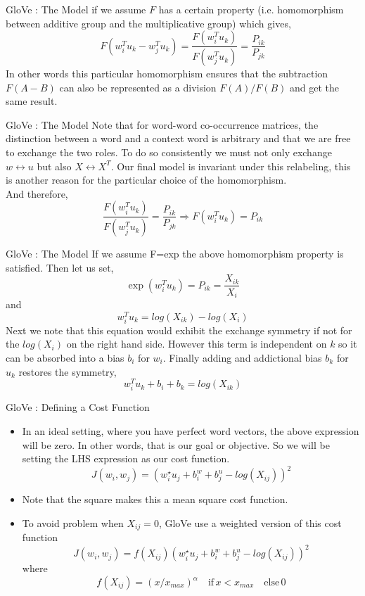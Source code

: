 \documentclass[11pt]{beamer}
\begin{document}
\begin{frame}{GloVe : The Model}
if we assume $F$ has a certain property (i.e. homomorphism between additive group and the multiplicative group) which gives,
$$F(w_i^T u_k-w_j^T u_k) = \frac{F(w_i^T u_k)}{F(w_j^T u_k)} = \frac{P_{ik}}{P_{jk}}$$
In other words this particular homomorphism ensures that the subtraction $F(A-B)$ can also be represented as a division $F(A)/F(B)$ and get the same result. 
\end{frame}
\begin{frame}{GloVe : The Model}
Note that for word-word co-occurrence matrices, the distinction between a word and a context word is arbitrary and that we are free to exchange the two roles. To do so consistently we must not only exchange $w \leftrightarrow u$ but also $X \leftrightarrow X^T$. Our final model is invariant under this relabeling, this is another reason for the particular choice of the homomorphism.
\\
And therefore,
$$\frac{F(w_i^T u_k)}{F(w_j^T u_k)} = \frac{P_{ik}}{P_{jk}} \Rightarrow F(w_i^T u_k) = P_{ik}$$
\end{frame}
\begin{frame}{GloVe : The Model}
If we assume F=exp the above homomorphism property is satisfied. Then let us set,
$$\exp(w_i^T u_k) = P_{ik}= \frac{X_{ik}}{X_i}$$
and
$$w_i^T u_k = log(X_{ik})-log(X_i)$$
Next we note that this equation would exhibit the exchange symmetry if not for the $log(X_i)$ on the right hand side. However this term is independent on $k$ so it can be absorbed into a bias $b_i$ for $w_i$. Finally adding and addictional bias $b_k$ for $u_k$ restores the symmetry,
$$w_i^T u_k + b_i + b_k = log(X_{ik})$$
\end{frame}
\begin{frame}{GloVe : Defining a Cost Function}
\begin{itemize}
\item In an ideal setting, where you have perfect word vectors, the above expression will be zero. In other words, that is our goal or objective. So we will be setting the LHS expression as our cost function.
\begin{equation}
J(w_i, w_j)= (w_i^\star u_j + b^w_i +b^u_j - log(X_{ij}))^2 
\end{equation}

\item Note that the square makes this a mean square cost function. 

\item To avoid problem when $X_{ij} = 0$, GloVe use a weighted version of this cost function
\begin{equation}
J(w_i, w_j)= f(X_{ij})(w_i^\star u_j + b^w_i +b^u_j - log(X_{ij}))^2
\end{equation}
where
$$f(X_{ij}) = (x/x_{max})^\alpha \quad \text{if} \, x < x_{max} \quad \text{else} \, 0$$
\end{itemize}
\end{frame}
\end{document}
